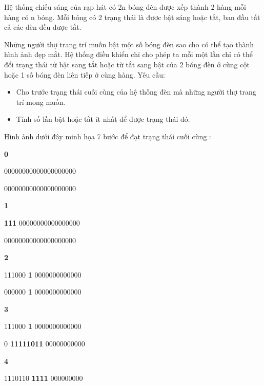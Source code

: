 Hệ thống chiếu sáng của rạp hát có 2n bóng đèn được xếp thành 2 hàng mỗi hàng có n bóng. Mỗi bóng có 2 trạng thái là được bật sáng hoặc tắt, ban đầu tất cả các đèn đều được tắt.  

   Những người thợ trang trí muốn bật một số bóng đèn sao cho có thể tạo thành hình ảnh đẹp mắt. Hệ thống điều khiển chỉ cho phép ta mỗi một lần chỉ có thể đổi trạng thái từ bật sang tắt hoặc từ tắt sang bật của 2 bóng đèn ở cùng cột hoặc 1 số bóng đèn liên tiếp ở cùng hàng.
   Yêu cầu:  
\begin{itemize}
	\item     Cho trước trạng thái cuối cùng của hệ thống đèn mà những người thợ trang trí mong muốn.   
	\item     Tính số lần bật hoặc tắt ít nhất để được trạng thái đó.   
\end{itemize}









   Hình ảnh dưới đây minh họa 7 bước để đạt trạng thái cuối cùng :  



\textbf{          0         }

         00000000000000000000                          

         00000000000000000000                          

\textbf{          1         }

\textbf{          111         }         00000000000000000                          

         00000000000000000000                          

\textbf{          2         }

         111000         \textbf{          1         }         0000000000000                          

         000000         \textbf{          1         }         0000000000000                          

\textbf{          3         }

         111000         \textbf{          1         }         0000000000000        

         0         \textbf{          11111011         }         00000000000                          

\textbf{          4         }

         1110110         \textbf{          1111         }         000000000                          

